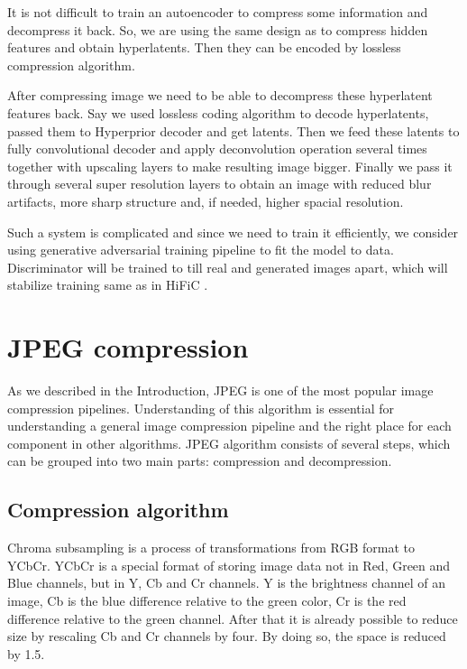 It is not difficult to train an autoencoder to compress some information and decompress it back. So, we are using the same design as \cite{balle_variational_2018} to compress hidden features and obtain hyperlatents. Then they can be encoded by lossless compression algorithm.

After compressing image we need to be able to decompress these hyperlatent features back. Say we used lossless coding algorithm to decode hyperlatents, passed them to Hyperprior decoder and get latents. Then we feed these latents to fully convolutional decoder and apply deconvolution operation several times together with upscaling layers to make resulting image bigger. Finally we pass it through several super resolution layers to obtain an image with reduced blur artifacts, more sharp structure and, if needed, higher spacial resolution.

Such a system is complicated and since we need to train it efficiently, we consider using generative adversarial training pipeline to fit the model to data. Discriminator will be trained to till real and generated images apart, which will stabilize training same as in HiFiC \cite{mentzer_high_fidelity_2020}.

\section{JPEG compression}

As we described in the Introduction, JPEG is one of the most popular image compression pipelines. Understanding of this algorithm is essential for understanding a general image compression pipeline and the right place for each component in other algorithms. JPEG algorithm consists of several steps, which can be grouped into two main parts: compression and decompression.

\subsection{Compression algorithm}

\label{section:traditional-compression}

Chroma subsampling is a process of transformations from RGB format to YCbCr. YCbCr is a special format of storing image data not in Red, Green and Blue channels, but in Y, Cb and Cr channels. Y is the brightness channel of an image, Cb is the blue difference relative to the green color, Cr is the red difference relative to the green channel. After that it is already possible to reduce size by rescaling Cb and Cr channels by four. By doing so, the space is reduced by 1.5.

